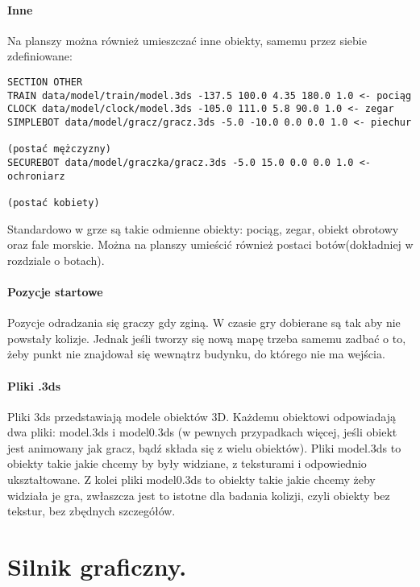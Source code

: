 \documentclass[licencjacka]{pracamgr}
\begin{document}
\subsubsection{Inne}

Na planszy można również umieszczać inne obiekty, samemu przez siebie zdefiniowane:

\begin{verbatim}
SECTION OTHER
TRAIN data/model/train/model.3ds -137.5 100.0 4.35 180.0 1.0 <- pociąg
CLOCK data/model/clock/model.3ds -105.0 111.0 5.8 90.0 1.0 <- zegar
SIMPLEBOT data/model/gracz/gracz.3ds -5.0 -10.0 0.0 0.0 1.0 <- piechur
                                                                                                        (postać mężczyzny)
SECUREBOT data/model/graczka/gracz.3ds -5.0 15.0 0.0 0.0 1.0 <- ochroniarz
                                                                                                                    (postać kobiety)
\end{verbatim}

Standardowo w grze są takie odmienne obiekty: pociąg, zegar, obiekt obrotowy oraz fale morskie.
Można na planszy umieścić również postaci botów(dokładniej w rozdziale o botach).

\subsubsection{Pozycje startowe}

Pozycje odradzania się graczy gdy zginą. W czasie gry dobierane są tak aby nie powstały kolizje.
Jednak jeśli tworzy się nową mapę trzeba samemu zadbać o to, żeby punkt nie znajdował się wewnątrz
budynku, do którego nie ma wejścia.

\subsubsection{Pliki .3ds}

Pliki 3ds przedstawiają modele obiektów 3D. Każdemu obiektowi odpowiadają dwa pliki: model.3ds i model0.3ds
(w pewnych przypadkach więcej, jeśli obiekt jest animowany jak gracz, bądź składa się z wielu obiektów).
Pliki model.3ds to obiekty takie jakie chcemy by były widziane, z teksturami i odpowiednio ukształtowane.
Z kolei pliki model0.3ds to obiekty takie jakie chcemy żeby widziała je gra, zwłaszcza jest to istotne dla
badania kolizji, czyli obiekty bez tekstur, bez zbędnych szczegółów.


\chapter{Silnik graficzny.}
\end{document}
